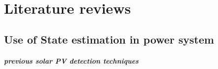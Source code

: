 \section{Literature reviews}

\subsection{Use of State estimation in power system}

\subparagraph{previous solar PV detection techniques}
